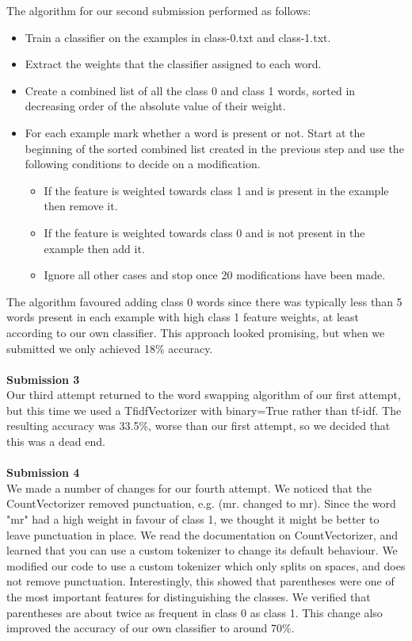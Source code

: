 \documentclass{article}
\begin{document}
\newpage
The algorithm for our second submission performed as follows:
\begin{itemize}
  \item{Train a classifier on the examples in class-0.txt and class-1.txt.}
  \item{Extract the weights that the classifier assigned to each word.}
  \item{Create a combined list of all the class 0 and class 1 words, sorted in decreasing order of the absolute value of their weight.}
  \item{For each example mark whether a word is present or not. Start at the beginning of the sorted combined list created in the previous step and use the following conditions to decide on a modification.}
  \begin{itemize}
    \item{If the feature is weighted towards class 1 and is present in the example then remove it.}
    \item{If the feature is weighted towards class 0 and is not present in the example then add it.}
    \item{Ignore all other cases and stop once 20 modifications have been made.}
  \end{itemize}
\end{itemize}
The algorithm favoured adding class 0 words since there was typically less than 5 words present in each example with high class 1 feature weights, at least according to our own classifier. This approach looked promising, but when we submitted we only achieved 18\% accuracy. \\
\\
\textbf{\large Submission 3} \\
Our third attempt returned to the word swapping algorithm of our first attempt, but this time we used a TfidfVectorizer with binary=True rather than tf-idf. The resulting accuracy was 33.5\%, worse than our first attempt, so we decided that this was a dead end.\\
\\
\textbf{\large Submission 4} \\
We made a number of changes for our fourth attempt. We noticed that the CountVectorizer removed punctuation, e.g. (mr. changed to mr). Since the word "mr" had a high weight in favour of class 1, we thought it might be better to leave punctuation in place. We read the documentation on CountVectorizer, and learned that you can use a custom tokenizer to change its default behaviour. We modified our code to use a custom tokenizer which only splits on spaces, and does not remove punctuation. Interestingly, this showed that parentheses were one of the most important features for distinguishing the classes. We verified that parentheses are about twice as frequent in class 0 as class 1. This change also improved the accuracy of our own classifier to around 70\%. \\
\end{document}
